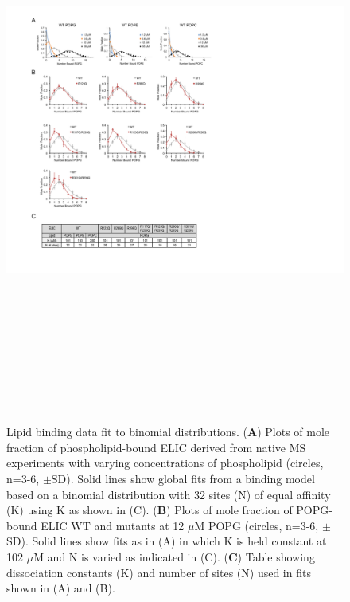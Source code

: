 \documentclass[12pt]{ruthesis_nofloat}
\begin{document}
\begin{figure}
\includegraphics[width=5.51458in,height=7.04808in]{./pandoc_test/media/image14.pdf}
\caption{}
\end{figure}

\begin{figure}
\caption[Lipid binding data fit to binomial
distributions.] {Lipid binding data fit to binomial
distributions. (\textbf{A}) Plots of mole fraction of phospholipid-bound
ELIC derived from native MS experiments with varying concentrations of
phospholipid (circles, n=3-6, $\pm$SD). Solid lines show global fits from a
binding model based on a binomial distribution with 32 sites (N) of
equal affinity (K) using K as shown in (C). (\textbf{B}) Plots of mole
fraction of POPG-bound ELIC WT and mutants at 12 $\mu$M POPG (circles,
n=3-6, $\pm$SD). Solid lines show fits as in (A) in which K is held constant
at 102 $\mu$M and N is varied as indicated in (C). (\textbf{C}) Table
showing dissociation constants (K) and number of sites (N) used in fits
shown in (A) and (B).} \label{fig:Supplementary Fig. 4}
\end{figure}
\end{document}
